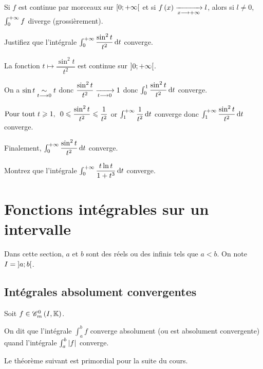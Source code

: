 \begin{rem}
Si \(f\) est continue par morceaux sur \(\left[0;+\infty\right[\) et si \(f\left(x\right)\xrightarrow[x\longrightarrow+\infty]{}l\), alors si \(l\not=0\), \(\int_0^{+\infty}f\) diverge (grossièrement).
\end{rem}

\begin{exo}
Justifiez que l'intégrale \(\int_0^{\pinf}\dfrac{\sin^2t}{t^2}\odif{t}\) converge.
\end{exo}

\begin{corr}
La fonction \(t\mapsto\dfrac{\sin^2t}{t^2}\) est continue sur \(\left]0;+\infty\right[\).

On a \(\sin t\underset{t\longrightarrow0}{\sim}t\) donc \(\dfrac{\sin^2t}{t^2}\xrightarrow[t\longrightarrow0]{}1\) donc \(\int_0^1\dfrac{\sin^2t}{t^2}\odif{t}\) converge.

\(\quantifs{\Tpt t\geq1}0\leq\dfrac{\sin^2t}{t^2}\leq\dfrac{1}{t^2}\) or \(\int_1^{\pinf}\dfrac{1}{t^2}\odif{t}\) converge donc \(\int_1^{\pinf}\dfrac{\sin^2t}{t^2}\odif{t}\) converge.

Finalement, \(\int_0^{\pinf}\dfrac{\sin^2t}{t^2}\odif{t}\) converge.
\end{corr}

\begin{exo}
Montrez que l'intégrale \(\int_0^{\pinf}\dfrac{t\ln t}{1+t^3}\odif{t}\) converge.
\end{exo}

\section{Fonctions intégrables sur un intervalle}

Dans cette section, \(a\) et \(b\) sont des réels ou des infinis tels que \(a<b\). On note \(I=\left]a;b\right[\).

\subsection{Intégrales absolument convergentes}

\begin{defi}
Soit \(f\in\contm[I]\).

On dit que l'intégrale \(\int_a^bf\) converge absolument (ou est absolument convergente) quand l'intégrale \(\int_a^b\left\lvert f\right\rvert\) converge.
\end{defi}

Le théorème suivant est primordial pour la suite du cours.

